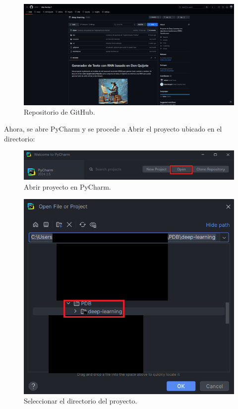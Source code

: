 \documentclass{article}
\begin{document}
\begin{figure}[H]
    \centering
    \includegraphics[scale=0.3]{github-repo.png}
    \caption{Repositorio de GitHub.}
\end{figure}

Ahora, se abre PyCharm y se procede a Abrir el proyecto ubicado en el directorio:

\begin{figure}[H]
    \centering
    \includegraphics[scale=0.6]{py8.png}
    \caption{Abrir proyecto en PyCharm.}
\end{figure}

\begin{figure}[H]
    \centering
    \includegraphics[scale=0.5]{py9.png}
    \caption{Seleccionar el directorio del proyecto.}
\end{figure}
\end{document}
